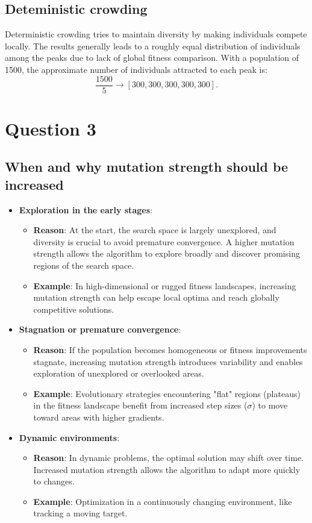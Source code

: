 \documentclass[12pt,letterpaper]{article}
\begin{document}
\subsection*{Deteministic crowding}
Deterministic crowding tries to maintain diversity by making individuals compete locally. 
The results generally leads to a roughly equal distribution of individuals among the peaks due to lack of global fitness comparison.
With a population of 1500, the approximate number of individuals attracted to each peak is:
\[
\frac{1500}{5} \rightarrow \left[300, 300, 300, 300, 300\right].
\]

\section*{Question 3}
\subsection*{When and why mutation strength should be increased}
\begin{itemize}
    \item \textbf{Exploration in the early stages}:
    \begin{itemize}
        \item \textbf{Reason}: At the start, the search space is largely unexplored, and diversity is crucial to avoid premature convergence. A higher mutation strength allows the algorithm to explore broadly and discover promising regions of the search space.
        \item \textbf{Example}: In high-dimensional or rugged fitness landscapes, increasing mutation strength can help escape local optima and reach globally competitive solutions.
    \end{itemize}
    \item \textbf{Stagnation or premature convergence}:
    \begin{itemize}
        \item \textbf{Reason}: If the population becomes homogeneous or fitness improvements stagnate, increasing mutation strength introduces variability and enables exploration of unexplored or overlooked areas.
        \item \textbf{Example}: Evolutionary strategies encountering "flat" regions (plateaus) in the fitness landscape benefit from increased step sizes (\( \sigma \)) to move toward areas with higher gradients.
    \end{itemize}
    \item \textbf{Dynamic environments}:
    \begin{itemize}
        \item \textbf{Reason}: In dynamic problems, the optimal solution may shift over time. Increased mutation strength allows the algorithm to adapt more quickly to changes.
        \item \textbf{Example}: Optimization in a continuously changing environment, like tracking a moving target.
    \end{itemize}
\end{itemize}
\end{document}
